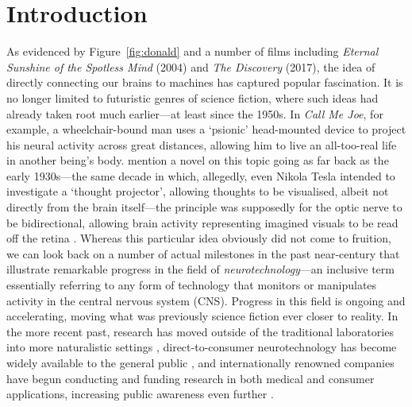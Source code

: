 \cleardoublepage%
%
\chapter*{Introduction}

As evidenced by Figure~\ref{fig:donald} and a number of films including \emph{Eternal Sunshine of the Spotless Mind} (2004) and \emph{The Discovery} (2017), the idea of directly connecting our brains to machines has captured popular fascination. It is no longer limited to futuristic genres of science fiction, where such ideas had already taken root much earlier---at least since the 1950s. In  \emph{Call Me Joe}, for example, a wheelchair-bound man uses a `psionic' head-mounted device to project his neural activity across great distances, allowing him to live an all-too-real life in another being's body.\nocite{anderson1957callmejoe}  mention a novel on this topic going as far back as the early 1930s---the same decade in which, allegedly, even Nikola Tesla intended to investigate a `thought projector', allowing thoughts to be visualised, albeit not directly from the brain itself---the principle was supposedly for the optic nerve to be bidirectional, allowing brain activity representing imagined visuals to be read off the retina \cite{tesla1993fantastic}. Whereas this particular idea obviously did not come to fruition, we can look back on a number of actual milestones in the past near-century that illustrate remarkable progress in the field of \emph{neurotechnology}---an inclusive term essentially referring to any form of technology that monitors or manipulates activity in the central nervous system (CNS). Progress in this field is ongoing and accelerating, moving what was previously science fiction ever closer to reality. In the more recent past, research has moved outside of the traditional laboratories into more naturalistic settings \cite{makeig2009mobi}, direct-to-consumer neurotechnology has become widely available to the general public \cite{ienca2018brainleaks}, and internationally renowned companies have begun conducting and funding research in both medical and consumer applications, increasing public awareness even further \cite{musk2019,moses2019fbspeech}.

